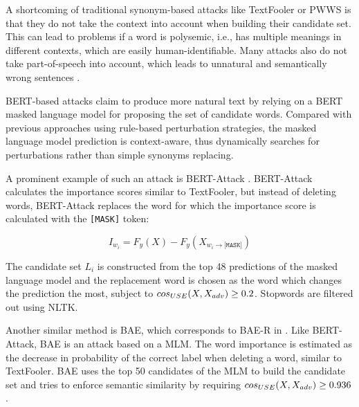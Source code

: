 A shortcoming of traditional synonym-based attacks like TextFooler or PWWS
is that they do not take the context into account when building their candidate
set. This can lead to problems if a word is polysemic, i.e., has multiple meanings
in different contexts, which are easily human-identifiable. 
Many attacks also do not take part-of-speech into account,
which leads to unnatural and semantically wrong sentences \cite{https://doi.org/10.48550/arxiv.2109.07403}.

BERT-based attacks
claim to produce more natural text by relying on a BERT masked language model for proposing the set of candidate words. 
Compared with previous approaches using rule-based perturbation strategies, the masked language model prediction is context-aware, thus dynamically searches for perturbations rather than simple synonyms replacing.

A prominent example of such
an attack is BERT-Attack \cite{conf/emnlp/LiMGXQ20}. BERT-Attack calculates the importance scores
similar to TextFooler, but instead of deleting words, BERT-Attack replaces the
word for which the importance score is calculated with the \texttt{[MASK]} token:

\begin{equation}
  I_{w_i} = F_y(X) - F_y(X_{w_i \rightarrow \texttt{[MASK]}})
\end{equation}

The candidate set $L_i$
is constructed from the top 48 predictions of the masked
language model and the replacement word is chosen as the word which changes
the prediction the most, subject to $cos_{\tiny{USE}}(X, X_{adv}
) \geq 0.2$. Stopwords are filtered out
using NLTK.

Another similar method is BAE, which corresponds to BAE-R in \cite{conf/emnlp/GargR20}. 
Like BERT-Attack, BAE is an attack
based on a MLM. The word importance is estimated as the decrease in probability
of the correct label when deleting a word, similar to TextFooler. BAE uses the
top 50 candidates of the MLM to build the candidate set and tries to enforce
semantic similarity by requiring $cos_{\tiny{USE}}(X, X_{adv}
) \geq 0.936$.

